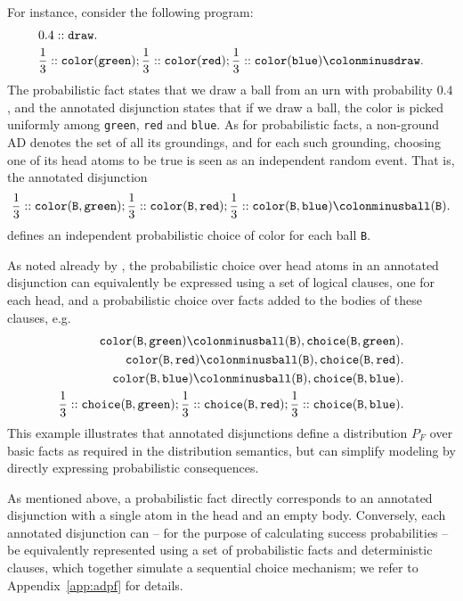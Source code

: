 \documentclass[a4paper]{article}
\begin{document}
For instance, consider the following program:
\begin{align*}
& 0.4::\mathtt{draw}.\\
& \frac{1}{3}::\mathtt{color(green)} ; \frac{1}{3}::\mathtt{color(red)}
 ; \frac{1}{3}::\mathtt{color(blue)} \colonminus \mathtt{draw}.
\end{align*}
The probabilistic fact states that we draw a ball from an urn with
probability $0.4$, and the annotated disjunction states that if we
draw a ball, the color is picked uniformly among \verb|green|,
\verb|red| and \verb|blue|. As for probabilistic facts,
a non-ground AD denotes the set of all its groundings, and for each
such grounding, choosing one of its head atoms to be true is seen as
an independent random event. That is, the annotated disjunction
\begin{equation*}
 \frac{1}{3}::\mathtt{color(B,green)} ;
 \frac{1}{3}::\mathtt{color(B,red)} ;
 \frac{1}{3}::\mathtt{color(B,blue) \colonminus ball(B).}
\end{equation*}
defines an independent probabilistic choice of color for each ball
\verb|B|. 

As noted already by \citet{Vennekens04}, the probabilistic choice over
head atoms in an annotated disjunction can equivalently be expressed
using a set of logical clauses, one for each head, and a probabilistic
choice over facts added to the bodies of these clauses, e.g.
\begin{align*}
\mathtt{color(B,green) \colonminus ball(B), choice(B,green).}\\
\mathtt{color(B,red) \colonminus ball(B), choice(B,red).}\\
\mathtt{color(B,blue) \colonminus ball(B), choice(B,blue).}\\
 \frac{1}{3}::\mathtt{choice(B,green)} ;
 \frac{1}{3}::\mathtt{choice(B,red)} ;
 \frac{1}{3}::\mathtt{choice(B,blue)}. 
\end{align*}
This example illustrates that annotated disjunctions define  a distribution  $P_F$
over basic facts as required in the 
distribution semantics, but can simplify modeling by directly expressing
probabilistic consequences. 

As mentioned above, a probabilistic fact directly corresponds to an
annotated disjunction with a single atom in the head and an empty
body. Conversely, each annotated disjunction can -- for the purpose of
calculating success probabilities -- be equivalently
represented using a set of probabilistic facts and deterministic
clauses, which together simulate a sequential choice mechanism; we
refer to Appendix~\ref{app:adpf} for details. 
\end{document}
